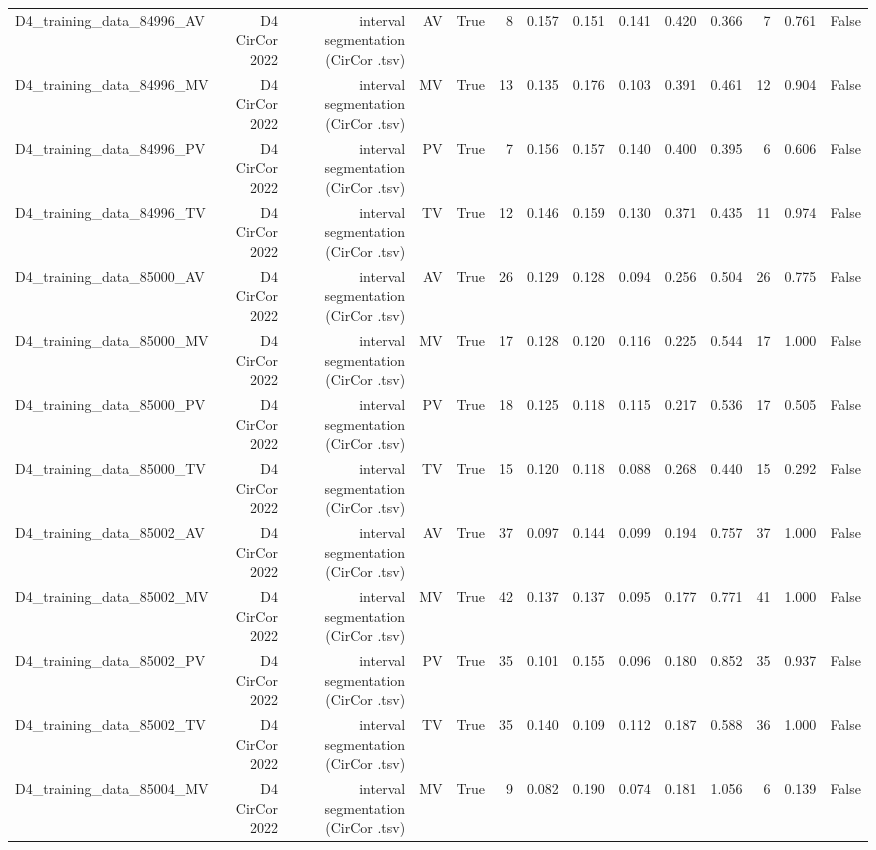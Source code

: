 \begin{table}[htbp]
\begin{tabular}{lrrrrrrrrrrrrr}
    D4\_training\_data\_84996\_AV & D4 CirCor 2022 & interval segmentation (CirCor .tsv) & AV & True & 8 & 0.157 & 0.151 & 0.141 & 0.420 & 0.366 & 7 & 0.761 & False \\
    D4\_training\_data\_84996\_MV & D4 CirCor 2022 & interval segmentation (CirCor .tsv) & MV & True & 13 & 0.135 & 0.176 & 0.103 & 0.391 & 0.461 & 12 & 0.904 & False \\
    D4\_training\_data\_84996\_PV & D4 CirCor 2022 & interval segmentation (CirCor .tsv) & PV & True & 7 & 0.156 & 0.157 & 0.140 & 0.400 & 0.395 & 6 & 0.606 & False \\
    D4\_training\_data\_84996\_TV & D4 CirCor 2022 & interval segmentation (CirCor .tsv) & TV & True & 12 & 0.146 & 0.159 & 0.130 & 0.371 & 0.435 & 11 & 0.974 & False \\
    D4\_training\_data\_85000\_AV & D4 CirCor 2022 & interval segmentation (CirCor .tsv) & AV & True & 26 & 0.129 & 0.128 & 0.094 & 0.256 & 0.504 & 26 & 0.775 & False \\
    D4\_training\_data\_85000\_MV & D4 CirCor 2022 & interval segmentation (CirCor .tsv) & MV & True & 17 & 0.128 & 0.120 & 0.116 & 0.225 & 0.544 & 17 & 1.000 & False \\
    D4\_training\_data\_85000\_PV & D4 CirCor 2022 & interval segmentation (CirCor .tsv) & PV & True & 18 & 0.125 & 0.118 & 0.115 & 0.217 & 0.536 & 17 & 0.505 & False \\
    D4\_training\_data\_85000\_TV & D4 CirCor 2022 & interval segmentation (CirCor .tsv) & TV & True & 15 & 0.120 & 0.118 & 0.088 & 0.268 & 0.440 & 15 & 0.292 & False \\
    D4\_training\_data\_85002\_AV & D4 CirCor 2022 & interval segmentation (CirCor .tsv) & AV & True & 37 & 0.097 & 0.144 & 0.099 & 0.194 & 0.757 & 37 & 1.000 & False \\
    D4\_training\_data\_85002\_MV & D4 CirCor 2022 & interval segmentation (CirCor .tsv) & MV & True & 42 & 0.137 & 0.137 & 0.095 & 0.177 & 0.771 & 41 & 1.000 & False \\
    D4\_training\_data\_85002\_PV & D4 CirCor 2022 & interval segmentation (CirCor .tsv) & PV & True & 35 & 0.101 & 0.155 & 0.096 & 0.180 & 0.852 & 35 & 0.937 & False \\
    D4\_training\_data\_85002\_TV & D4 CirCor 2022 & interval segmentation (CirCor .tsv) & TV & True & 35 & 0.140 & 0.109 & 0.112 & 0.187 & 0.588 & 36 & 1.000 & False \\
    D4\_training\_data\_85004\_MV & D4 CirCor 2022 & interval segmentation (CirCor .tsv) & MV & True & 9 & 0.082 & 0.190 & 0.074 & 0.181 & 1.056 & 6 & 0.139 & False \\

\end{tabular}
\end{table}
